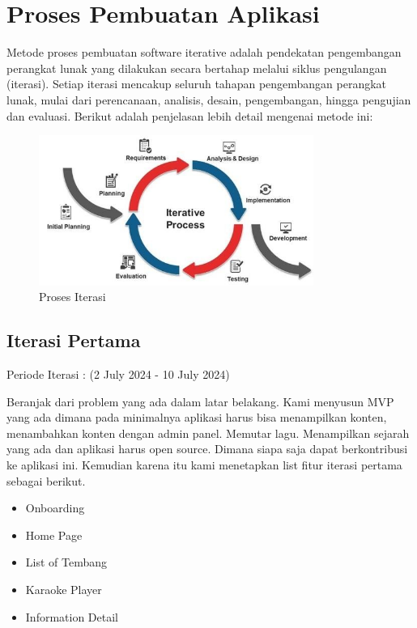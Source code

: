 \section{Proses Pembuatan Aplikasi}
Metode proses pembuatan software iterative adalah pendekatan pengembangan perangkat lunak yang dilakukan secara bertahap melalui siklus pengulangan (iterasi). 
Setiap iterasi mencakup seluruh tahapan pengembangan perangkat lunak, mulai dari perencanaan, analisis, desain, pengembangan, hingga pengujian dan evaluasi. 
Berikut adalah penjelasan lebih detail mengenai metode ini:

\begin{figure}[H]
    \centering
    \includegraphics[width=0.8\textwidth]{assets/iterative.jpg}
    \caption{Proses Iterasi}
\end{figure}

\subsection{Iterasi Pertama}
Periode Iterasi : (2 July 2024 - 10 July 2024)

Beranjak dari problem yang ada dalam latar belakang. Kami menyusun MVP yang ada dimana pada minimalnya
aplikasi harus bisa menampilkan konten, menambahkan konten dengan admin panel. Memutar lagu. Menampilkan sejarah yang ada
dan aplikasi harus open source. Dimana siapa saja dapat berkontribusi ke aplikasi ini. Kemudian karena itu kami menetapkan 
list fitur iterasi pertama sebagai berikut.

\begin{itemize}
    \item Onboarding
    \item Home Page
    \item List of Tembang
    \item Karaoke Player
    \item Information Detail
\end{itemize}

